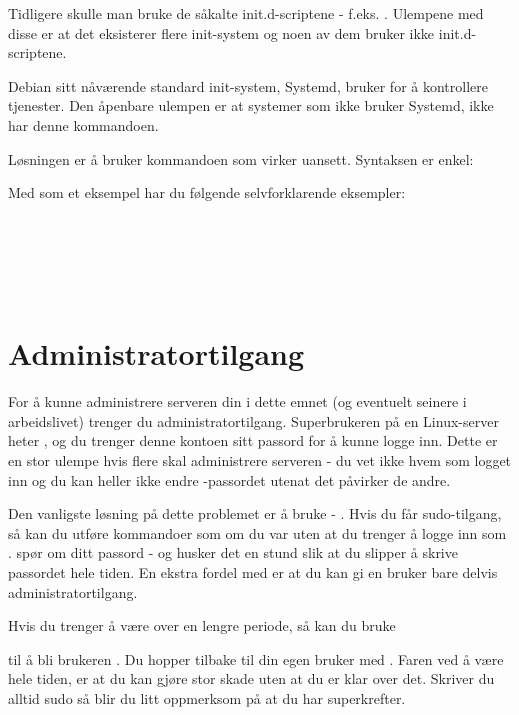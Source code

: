Tidligere skulle man bruke de såkalte init.d-scriptene - f.eks. .
Ulempene med disse er at det eksisterer flere init-system og noen av dem bruker ikke
init.d-scriptene. 

Debian sitt nåværende standard init-system, Systemd, bruker  for å kontrollere tjenester.
Den åpenbare ulempen er at systemer som ikke bruker Systemd, ikke har denne kommandoen.

Løsningen er å bruker kommandoen  som virker uansett. Syntaksen er enkel:


Med  som et eksempel har du følgende selvforklarende eksempler:

\\
\\
\\
\\

\section{Administratortilgang}

For å kunne administrere serveren din i dette emnet (og eventuelt seinere i arbeidslivet) 
trenger du administratortilgang. Superbrukeren på en Linux-server heter , og du
trenger denne kontoen sitt passord for å kunne logge inn. Dette er en stor ulempe hvis flere
skal administrere serveren - du vet ikke hvem som logget inn og du kan heller ikke endre 
-passordet utenat det påvirker de andre.

Den vanligste løsning på dette problemet er å bruke  - . 
Hvis du får sudo-tilgang, så kan du utføre kommandoer som om du var  uten at du
trenger å logge inn som .  spør om ditt passord - og husker det en stund
slik at du slipper å skrive passordet hele tiden. En ekstra fordel med  er at
du kan gi en bruker bare delvis administratortilgang. 

Hvis du trenger å være  over en lengre periode, så kan du bruke 


til å bli brukeren . Du hopper tilbake til din egen bruker med .
Faren ved å være  hele tiden, er at du kan gjøre stor skade uten at du er klar over
det. Skriver du alltid sudo så blir du litt oppmerksom på at du har superkrefter.

